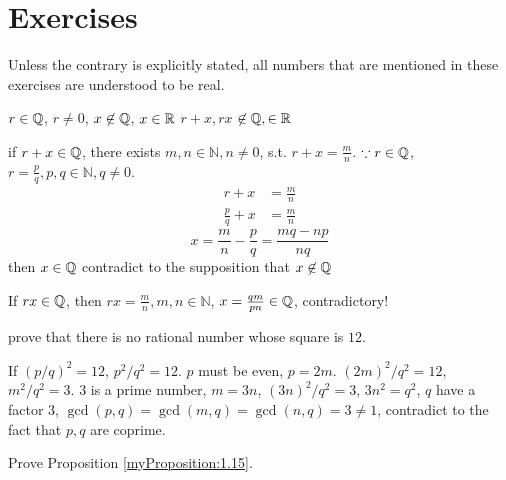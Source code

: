 \section{Exercises}

Unless the contrary is explicitly stated, all numbers that are mentioned in these exercises are understood to be real.

\begin{myexercise}
    \label{ex:1.1}
    $r \in {\protect\mathbb Q} $, $r \neq 0$, $x \not\in {\protect\mathbb Q} $, $x \in {\protect\mathbb R}$
    $r+x, rx$ $\not\in {\protect\mathbb Q} , \in {\protect\mathbb R}$
\end{myexercise}


\mySolve

if $r+x \in {\protect\mathbb Q} $, there exists $m, n \in \mathbb{N}, n \neq 0$, s.t. $r+x = \frac{m}{n}$.
    $\because r\in {\protect\mathbb Q} $, $r = \frac{p}{q}, p,q \in \mathbb{N}, q \neq 0$.
    \begin{align*}
        r + x &= \frac{m}{n}\\
        \frac{p}{q} + x &= \frac{m}{n}
    \end{align*}
    \begin{equation*}
        x = \frac{m}{n} - \frac{p}{q} = \frac{mq-np}{nq}
    \end{equation*}
    then $x \in {\protect\mathbb Q} $ contradict to the supposition that $x \not\in {\protect\mathbb Q} $

    If $rx \in {\protect\mathbb Q} $, then $rx = \frac{m}{n}, m,n\in \mathbb{N}$, $x = \frac{qm}{pn} \in {\protect\mathbb Q} $, contradictory!



\begin{myexercise}
    \label{ex:1.2}
    prove that there is no rational number whose square is $12$. 
\end{myexercise}


\mySolve

If $\left(p/q\right)^2 = 12$, $p^2/q^2 = 12$. $p$ must be even, $p = 2m$.
    $(2m)^2/q^2 = 12$, $m^2/q^2=3$. 
    $3$ is a prime number, $m = 3n$, $(3n)^2/q^2 = 3$, $3n^2 = q^2$, $q$ have a factor $3$,
    $\gcd(p,q) = \gcd(m,q) = \gcd(n,q) = 3 \neq 1$, contradict to the fact that $p,q$ are coprime.


\begin{myexercise}
    \label{ex:1.3}
    Prove Proposition \ref{myProposition:1.15}.
\end{myexercise}


\mySolve


